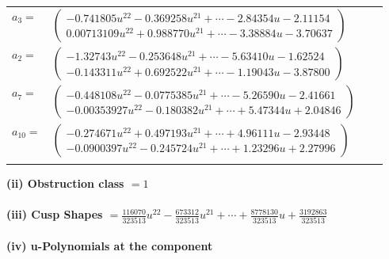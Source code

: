 \documentclass[1p]{elsarticle_modified}
\theoremstyle{definition}
\begin{document}
\begin{tabular}{m{7pt} m{180pt} m{7pt} m{180pt} }
\flushright $a_{3}=$&$\begin{pmatrix}-0.741805 u^{22}-0.369258 u^{21}+\cdots-2.84354 u-2.11154\\0.00713109 u^{22}+0.988770 u^{21}+\cdots-3.38884 u-3.70637\end{pmatrix}$ \\
\flushright $a_{2}=$&$\begin{pmatrix}-1.32743 u^{22}-0.253648 u^{21}+\cdots-5.63410 u-1.62524\\-0.143311 u^{22}+0.692522 u^{21}+\cdots-1.19043 u-3.87800\end{pmatrix}$ \\
\flushright $a_{7}=$&$\begin{pmatrix}-0.448108 u^{22}-0.0775385 u^{21}+\cdots-5.26590 u-2.41661\\-0.00353927 u^{22}-0.180382 u^{21}+\cdots+5.47344 u+2.04846\end{pmatrix}$ \\
\flushright $a_{10}=$&$\begin{pmatrix}-0.274671 u^{22}+0.497193 u^{21}+\cdots+4.96111 u-2.93448\\-0.0900397 u^{22}-0.245724 u^{21}+\cdots+1.23296 u+2.27996\end{pmatrix}$\\&\end{tabular}
\flushleft \textbf{(ii) Obstruction class $= 1$}\\~\\
\flushleft \textbf{(iii) Cusp Shapes $= \frac{116070}{323513} u^{22}-\frac{673312}{323513} u^{21}+\cdots+\frac{8778130}{323513} u+\frac{3192863}{323513}$}\\~\\
\newpage\renewcommand{\arraystretch}{1}
\flushleft \textbf{(iv) u-Polynomials at the component}\newline \\
\end{document}
